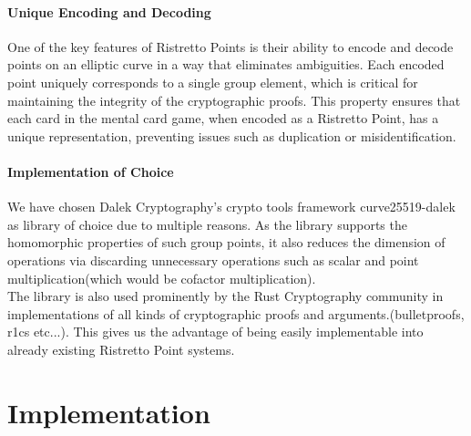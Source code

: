 \documentclass[12pt,a4paper]{report}
\begin{document}
\subsubsection{Unique Encoding and Decoding}
One of the key features of Ristretto Points is their ability to encode and decode points on an elliptic curve in a way that eliminates ambiguities.
Each encoded point uniquely corresponds to a single group element, which is critical for maintaining the integrity of the cryptographic proofs.
This property ensures that each card in the mental card game, when encoded as a Ristretto Point, has a unique representation, preventing issues such as duplication or misidentification.

\subsubsection{Implementation of Choice}
We have chosen Dalek Cryptography's crypto tools framework curve25519-dalek\cite{dalek:curve}
as library of choice due to multiple reasons.
As the library supports the homomorphic properties of such group points, it also reduces the dimension of operations via discarding unnecessary operations such as scalar and point multiplication(which would be cofactor multiplication).\\
The library is also used prominently by the Rust Cryptography community in 
implementations of all kinds of cryptographic proofs and arguments.(bulletproofs, r1cs etc...). This gives us the advantage of being easily implementable into already existing Ristretto Point systems.


\chapter{Implementation}
\end{document}
